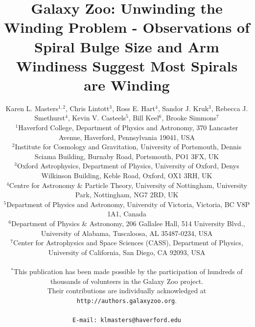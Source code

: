 \documentclass[usenatbib]{mn2e}
\newcommand{\etal}{{\it et al.}}
\begin{document}
\title[Galaxy Zoo: Unwinding the Winding Problem]{Galaxy Zoo: Unwinding the Winding Problem - Observations of Spiral Bulge Size and Arm Windiness Suggest Most Spirals are Winding}
\author[K.L. Masters \etal]{Karen L. Masters$^{1,2}$, Chris Lintott$^{3}$, Ross E. Hart$^{4}$, Sandor J. Kruk$^{3}$, \newauthor Rebecca J. Smethurst$^{4}$,  Kevin V. Casteels$^5$, Bill Keel$^6$, Brooke Simmons$^7$\\ %
$^1$Haverford College, Department of Physics and Astronomy, 370 Lancaster Avenue, Haverford, Pennsylvania 19041, USA\\
$^2$Institute for Cosmology and Gravitation, University of Portsmouth, Dennis Sciama Building, Burnaby Road, Portsmouth, PO1 3FX, UK \\
 $^{3}$Oxford Astrophysics, Department of Physics, University of Oxford, Denys Wilkinson Building, Keble Road, Oxford, OX1 3RH, UK\\
 $^4$Centre for Astronomy \& Particle Theory, University of Nottingham, University Park, Nottingham, NG7 2RD, UK\\
 $^5$Department of Physics and Astronomy, University of Victoria, Victoria, BC V8P 1A1, Canada\\
 $^6$Department of Physics \& Astronomy, 206 Gallalee Hall, 514 University Blvd., University of Alabama, Tuscaloosa, AL 35487-0234, USA\\
 $^7$Center for Astrophysics and Space Sciences (CASS), Department of Physics, University of California, San Diego, CA 92093, USA \\
\\
 $^*$This publication has been made possible by the participation of hundreds of thousands of volunteers in the Galaxy Zoo project. \\ Their contributions are individually acknowledged at \texttt{http://authors.galaxyzoo.org}. \\
\\
{\tt E-mail: klmasters@haverford.edu}
 }

 

\maketitle
\end{document}
